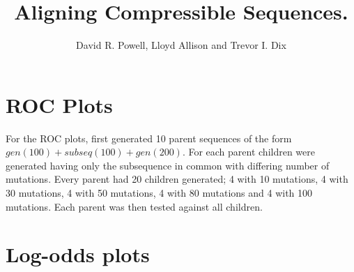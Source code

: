 \documentclass[a4paper,10pt,oneside]{article}
\begin{document}
\title{Aligning Compressible Sequences.}

\author{
  David R. Powell, Lloyd Allison and Trevor I. Dix \\
}

\date{}
\maketitle


\section{ROC Plots}

For the ROC plots, first generated 10 parent sequences of the form $gen(100)
+ subseq(100) + gen(200)$.  For each parent children were generated having
only the subsequence in common with differing number of mutations.  Every parent
had 20 children generated; 4 with 10 mutations, 4 with 30 mutations, 4 with 50
mutations, 4 with 80 mutations and 4 with 100 mutations.  Each parent was then
tested against all children.

\begin{figure}[htb]
\centerline{}
\end{figure}

\begin{figure}[htb]
\centerline{}
\end{figure}

\begin{figure}[htb]
\centerline{}
\end{figure}

\begin{figure}[htb]
\centerline{}
\end{figure}

\begin{figure}[htb]
\centerline{}
\end{figure}

\clearpage

\section{Log-odds plots}
\end{document}
